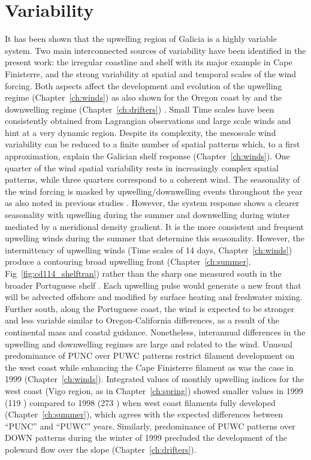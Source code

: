 \section{Variability} It has been shown that the upwelling region
of Galicia is a highly variable system. Two main interconnected
sources of variability have been identified in the present work:
the irregular coastline and shelf with its major example in Cape
Finisterre, and the strong variability at spatial and temporal
scales of the wind forcing. Both aspects affect the development
and evolution of the upwelling regime (Chapter~\ref{ch:winds}) as
also shown for the Oregon coast by \citet{Barth00,Samelson02} and
the downwelling regime (Chapter~\ref{ch:drifters})
\citep[e.g.][]{Dubert98}. Small Time scales have been consistently
obtained from Lagrangian observations and large scale winds and
hint at a very dynamic region. Despite its complexity, the
mesoscale wind variability can be reduced to a finite number of
spatial patterns which, to a first approximation, explain the
Galician shelf response (Chapter~\ref{ch:winds}). One quarter of
the wind spatial variability rests in increasingly complex spatial
patterns, while three quarters correspond to a coherent wind. The
seasonality of the wind forcing is masked by upwelling/downwelling
events throughout the year as also noted in previous studies
\citep{Alvarez-Salgado03}. However, the system response shows a
clearer seasonality with upwelling during the summer and
downwelling during winter mediated by a meridional density
gradient. It is the more consistent and frequent upwelling winds
during the summer that determine this seasonality. However, the
intermittency of upwelling winds (Time scales of 14 days,
Chapter~\ref{ch:winds}) produce a contouring broad upwelling front
(Chapter~\ref{ch:summer}, Fig~\ref{fig:cd114_shelftran})
\citep{Brink83} rather than the sharp one measured south in the
broader Portuguese shelf \citep{Peliz02}. Each upwelling pulse
would generate a new front that will be advected offshore and
modified by surface heating and freshwater mixing. Further south,
along the Portuguese coast, the wind is expected to be stronger
and less variable similar to Oregon-California differences, as a
result of the continental mass and coastal guidance. Nonetheless,
interannual differences in the upwelling and downwelling regimes
are large \citep{Huthnance02} and related to the wind. Unusual
predominance of PUNC over PUWC patterns restrict filament
development on the west coast while enhancing the Cape Finisterre
filament as was the case in 1999 (Chapter~\ref{ch:winds}).
Integrated values of monthly upwelling indices for the west coast
(Vigo region, as in Chapter~\ref{ch:spring}) showed smaller values
in 1999 (119 \Eidx) compared to 1998 (273 \Eidx) when west coast
filaments fully developed (Chapter~\ref{ch:summer}), which agrees
with the expected differences between ``PUNC'' and ``PUWC'' years.
Similarly, predominance of PUWC patterns over DOWN patterns during
the winter of 1999 precluded the development of the poleward flow
over the slope (Chapter~\ref{ch:drifters}).


